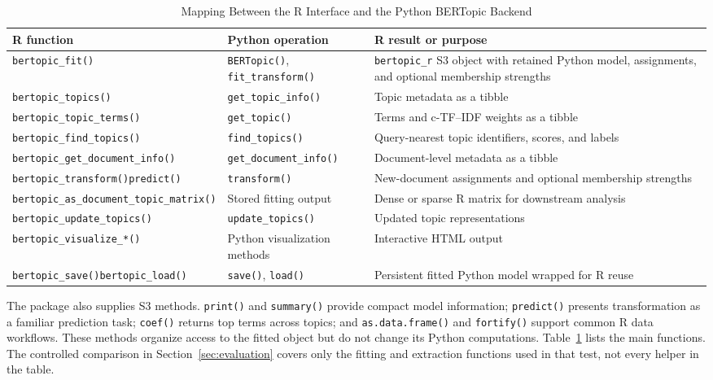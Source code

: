 \documentclass[12pt]{article}
\newcommand{\code}[1]{\texttt{#1}}
\newcommand{\fcode}[1]{\nolinkurl{#1}}
\begin{document}
\begin{table}[htbp]
\centering
\caption{Mapping Between the R Interface and the Python BERTopic Backend}
\label{tab:api_map}
\begin{threeparttable}
\small
\begin{tabularx}{\linewidth}{>{\raggedright\arraybackslash}p{3.8cm}
                             >{\raggedright\arraybackslash}p{3.4cm}
                             >{\raggedright\arraybackslash}X}
\toprule
R function & Python operation & R result or purpose \\
\midrule
\fcode{bertopic_fit()} & \fcode{BERTopic()}, \fcode{fit_transform()} & \fcode{bertopic_r} S3 object with retained Python model, assignments, and optional membership strengths \\
\fcode{bertopic_topics()} & \fcode{get_topic_info()} & Topic metadata as a tibble \\
\fcode{bertopic_topic_terms()} & \fcode{get_topic()} & Terms and c-TF--IDF weights as a tibble \\
\fcode{bertopic_find_topics()} & \fcode{find_topics()} & Query-nearest topic identifiers, scores, and labels \\
\fcode{bertopic_get_document_info()} & \fcode{get_document_info()} & Document-level metadata as a tibble \\
\fcode{bertopic_transform()}\newline \fcode{predict()} & \fcode{transform()} & New-document assignments and optional membership strengths \\
\fcode{bertopic_as_document_topic_matrix()} & Stored fitting output & Dense or sparse R matrix for downstream analysis \\
\fcode{bertopic_update_topics()} & \fcode{update_topics()} & Updated topic representations \\
\fcode{bertopic_visualize_*()} & Python visualization methods & Interactive HTML output \\
\fcode{bertopic_save()}\newline \fcode{bertopic_load()} & \fcode{save()}, \fcode{load()} & Persistent fitted Python model wrapped for R reuse \\
\bottomrule
\end{tabularx}
\end{threeparttable}
\end{table}

The package also supplies S3 methods. \code{print()} and \code{summary()} provide compact model information; \code{predict()} presents transformation as a familiar prediction task; \code{coef()} returns top terms across topics; and \code{as.data.frame()} and \code{fortify()} support common R data workflows. These methods organize access to the fitted object but do not change its Python computations. Table~\ref{tab:api_map} lists the main functions. The controlled comparison in Section~\ref{sec:evaluation} covers only the fitting and extraction functions used in that test, not every helper in the table.
\end{document}

